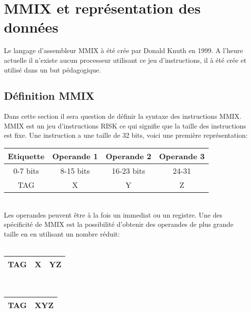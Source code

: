 \documentclass {article}
\theoremstyle{definition}
\theoremstyle{remark}
\begin{document}
\section{MMIX et représentation des données}
\label{partieMMIX}

Le langage d'assembleur MMIX à été crée par Donald Knuth en 1999.
A l'heure actuelle il n'existe aucun processeur utilisant ce jeu d'instructions, il
à été crée et utilisé dans un but pédagogique.



\subsection{Définition MMIX}

Dans cette section il sera question de définir la syntaxe des instructions MMIX.
MMIX est un jeu d'instructions RISK ce qui signifie que la taille des instructions
est fixe. Une instruction a une taille de 32 bits, voici une première représentation:

\begin{tabular}{|c|c|c|c|}
  \hline
  Etiquette & Operande 1 & Operande 2 & Operande 3\\
  \hline
  0-7 bits & 8-15 bits & 16-23 bits & 24-31  \\
  \hline
  TAG & X & Y & Z \\
  \hline
\end{tabular}
\\
Les operandes peuvent être à la fois un immediat ou un registre.
Une des spécificité de MMIX est la possibilité d'obtenir des operandes
de plus grande taille en en utilisant un nombre réduit:\\
\\
\begin{tabular}{|c|c|c|}
  \hline 
  TAG & X & YZ \\
  \hline
\end{tabular}\\
\begin{tabular}{|c|c|}
  \hline 
  TAG & XYZ \\
  \hline
\end{tabular}
\end{document}
